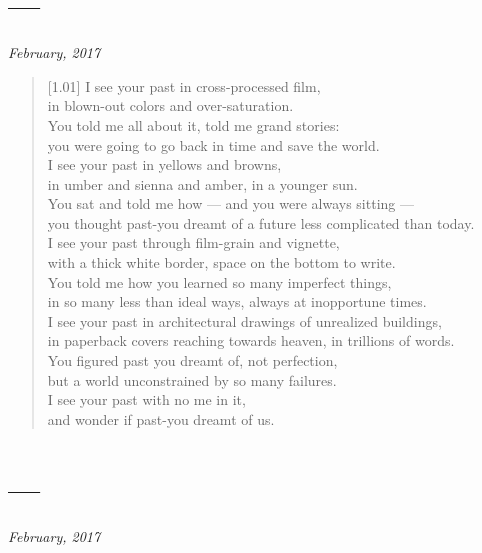 \section*{---}

\hfill\textit{February, 2017}

\begin{verse}[1.01\textwidth]
  I see your past in cross-processed film,\\
  in blown-out colors and over-saturation.\\
  \vin You told me all about it, told me grand stories:\\
  \vin you were going to go back in time and save the world.\\
  I see your past in yellows and browns,\\
  in umber and sienna and amber, in a younger sun.\\
  \vin You sat and told me how --- and you were always sitting ---\\
  \vin you thought past-you dreamt of a future less complicated than today.\\
  I see your past through film-grain and vignette,\\
  with a thick white border, space on the bottom to write.\\
  \vin You told me how you learned so many imperfect things,\\
  \vin in so many less than ideal ways, always at inopportune times.\\
  I see your past in architectural drawings of unrealized buildings,\\
  in paperback covers reaching towards heaven, in trillions of words.\\
  \vin You figured past you dreamt of, not perfection,\\
  \vin but a world unconstrained by so many failures.\\
  I see your past with no me in it,\\
  and wonder if past-you dreamt of us.
\end{verse}
\newpage

\section*{---}

\hfill\textit{February, 2017}

